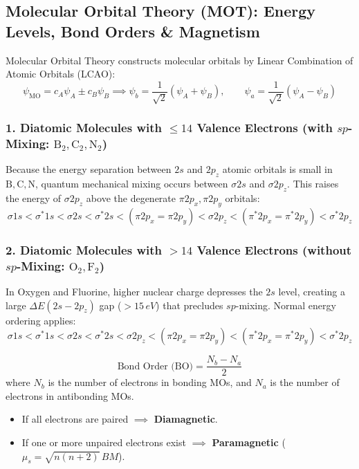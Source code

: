 \documentclass[10pt,a4paper]{article}
\begin{document}
\subsection{Molecular Orbital Theory (MOT): Energy Levels, Bond Orders \& Magnetism}
Molecular Orbital Theory constructs molecular orbitals by Linear Combination of Atomic Orbitals (LCAO):
\begin{equation}
  \psi_{\text{MO}} = c_A \psi_A \pm c_B \psi_B \implies \psi_b = \frac{1}{\sqrt{2}}(\psi_A + \psi_B), \qquad \psi_a = \frac{1}{\sqrt{2}}(\psi_A - \psi_B)
\end{equation}

\subsubsection{1. Diatomic Molecules with $\le 14$ Valence Electrons (with $sp$-Mixing: $\mathrm{B_2, C_2, N_2}$)}
Because the energy separation between $2s$ and $2p_z$ atomic orbitals is small in $\mathrm{B, C, N}$, quantum mechanical mixing occurs between $\sigma 2s$ and $\sigma 2p_z$. This raises the energy of $\sigma 2p_z$ above the degenerate $\pi 2p_x, \pi 2p_y$ orbitals:
\begin{equation}
  \sigma 1s < \sigma^* 1s < \sigma 2s < \sigma^* 2s < (\pi 2p_x = \pi 2p_y) < \sigma 2p_z < (\pi^* 2p_x = \pi^* 2p_y) < \sigma^* 2p_z
\end{equation}

\subsubsection{2. Diatomic Molecules with $> 14$ Valence Electrons (without $sp$-Mixing: $\mathrm{O_2, F_2}$)}
In Oxygen and Fluorine, higher nuclear charge depresses the $2s$ level, creating a large $\Delta E(2s-2p_z)$ gap ($> 15\,\si{eV}$) that precludes $sp$-mixing. Normal energy ordering applies:
\begin{equation}
  \sigma 1s < \sigma^* 1s < \sigma 2s < \sigma^* 2s < \sigma 2p_z < (\pi 2p_x = \pi 2p_y) < (\pi^* 2p_x = \pi^* 2p_y) < \sigma^* 2p_z
\end{equation}

\begin{formulabox}
\begin{equation}
  \text{Bond Order (BO)} = \frac{N_b - N_a}{2}
\end{equation}
where $N_b$ is the number of electrons in bonding MOs, and $N_a$ is the number of electrons in antibonding MOs.
\begin{itemize}
  \item If all electrons are paired $\implies$ \textbf{Diamagnetic}.
  \item If one or more unpaired electrons exist $\implies$ \textbf{Paramagnetic} ($\mu_s = \sqrt{n(n+2)}\,\si{BM}$).
\end{itemize}
\end{formulabox}
\end{document}
